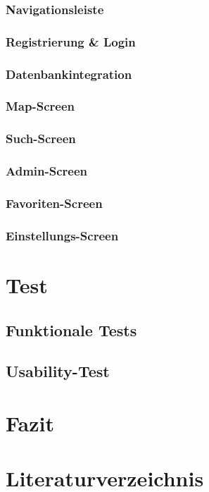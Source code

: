 \documentclass[12pt, a4paper, oneside]{article}
\begin{document}
\subsubsection{Navigationsleiste}
\subsubsection{Registrierung \& Login}
\subsubsection{Datenbankintegration}
\subsubsection{Map-Screen}
\subsubsection{Such-Screen}
\subsubsection{Admin-Screen}
\subsubsection{Favoriten-Screen}
\subsubsection{Einstellungs-Screen}

\section{Test}
\subsection{Funktionale Tests}
\subsection{Usability-Test}
\newpage

\section{Fazit}

\section{Literaturverzeichnis}

\renewcommand{\refname}{} 

\end{document}
